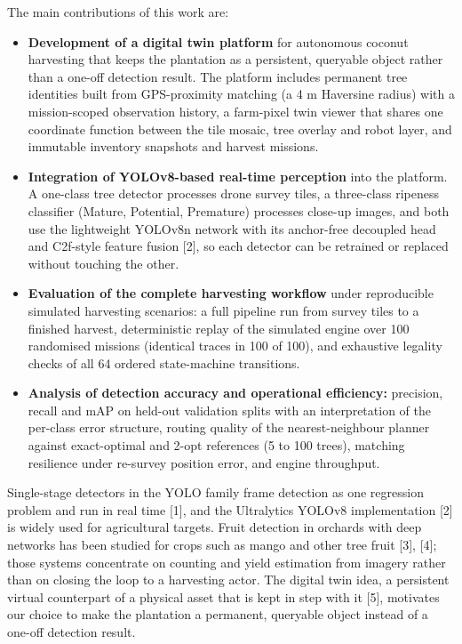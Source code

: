 \documentclass[10pt,a4paper]{article}
\newcommand{\irjsec}[1]{\par\vspace{6pt}\noindent{\cambria\bfseries\fontsize{12}{14}\selectfont\textbullet~#1}\par\vspace{3pt}}
\begin{document}
The main contributions of this work are:
\begin{itemize}
\itemsep1pt
\item \textbf{Development of a digital twin platform} for autonomous coconut harvesting that keeps the plantation as a persistent, queryable object rather than a one-off detection result. The platform includes permanent tree identities built from GPS-proximity matching (a 4 m Haversine radius) with a mission-scoped observation history, a farm-pixel twin viewer that shares one coordinate function between the tile mosaic, tree overlay and robot layer, and immutable inventory snapshots and harvest missions.
\item \textbf{Integration of YOLOv8-based real-time perception} into the platform. A one-class tree detector processes drone survey tiles, a three-class ripeness classifier (Mature, Potential, Premature) processes close-up images, and both use the lightweight YOLOv8n network with its anchor-free decoupled head and C2f-style feature fusion [2], so each detector can be retrained or replaced without touching the other.
\item \textbf{Evaluation of the complete harvesting workflow} under reproducible simulated harvesting scenarios: a full pipeline run from survey tiles to a finished harvest, deterministic replay of the simulated engine over 100 randomised missions (identical traces in 100 of 100), and exhaustive legality checks of all 64 ordered state-machine transitions.
\item \textbf{Analysis of detection accuracy and operational efficiency:} precision, recall and mAP on held-out validation splits with an interpretation of the per-class error structure, routing quality of the nearest-neighbour planner against exact-optimal and 2-opt references (5 to 100 trees), matching resilience under re-survey position error, and engine throughput.
\end{itemize}

\irjsec{RELATED WORK}
Single-stage detectors in the YOLO family frame detection as one regression problem and run in real time [1], and the Ultralytics YOLOv8 implementation [2] is widely used for agricultural targets. Fruit detection in orchards with deep networks has been studied for crops such as mango and other tree fruit [3], [4]; those systems concentrate on counting and yield estimation from imagery rather than on closing the loop to a harvesting actor. The digital twin idea, a persistent virtual counterpart of a physical asset that is kept in step with it [5], motivates our choice to make the plantation a permanent, queryable object instead of a one-off detection result.
\end{document}
